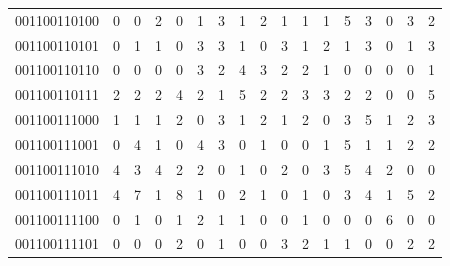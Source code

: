 \documentclass[10pt,a4paper]{article}
\begin{document}
\begin{longtable}{ |c|c|c|c|c|c|c|c|c|c|c|c|c|c|c|c|c| }
    001100110100              & 0                            & 0                                & 2                            & 0                              & 1   & 3   & 1   & 2   & 1   & 1   & 1   & 5   & 3   & 0   & 3   & 2   \\
    001100110101              & 0                            & 1                                & 1                            & 0                              & 3   & 3   & 1   & 0   & 3   & 1   & 2   & 1   & 3   & 0   & 1   & 3   \\
    001100110110              & 0                            & 0                                & 0                            & 0                              & 3   & 2   & 4   & 3   & 2   & 2   & 1   & 0   & 0   & 0   & 0   & 1   \\
    001100110111              & 2                            & 2                                & 2                            & 4                              & 2   & 1   & 5   & 2   & 2   & 3   & 3   & 2   & 2   & 0   & 0   & 5   \\
    001100111000              & 1                            & 1                                & 1                            & 2                              & 0   & 3   & 1   & 2   & 1   & 2   & 0   & 3   & 5   & 1   & 2   & 3   \\
    001100111001              & 0                            & 4                                & 1                            & 0                              & 4   & 3   & 0   & 1   & 0   & 0   & 1   & 5   & 1   & 1   & 2   & 2   \\
    001100111010              & 4                            & 3                                & 4                            & 2                              & 2   & 0   & 1   & 0   & 2   & 0   & 3   & 5   & 4   & 2   & 0   & 0   \\
    001100111011              & 4                            & 7                                & 1                            & 8                              & 1   & 0   & 2   & 1   & 0   & 1   & 0   & 3   & 4   & 1   & 5   & 2   \\
    001100111100              & 0                            & 1                                & 0                            & 1                              & 2   & 1   & 1   & 0   & 0   & 1   & 0   & 0   & 0   & 6   & 0   & 0   \\
    001100111101              & 0                            & 0                                & 0                            & 2                              & 0   & 1   & 0   & 0   & 3   & 2   & 1   & 1   & 0   & 0   & 2   & 2   \\

\end{longtable}
\end{document}
